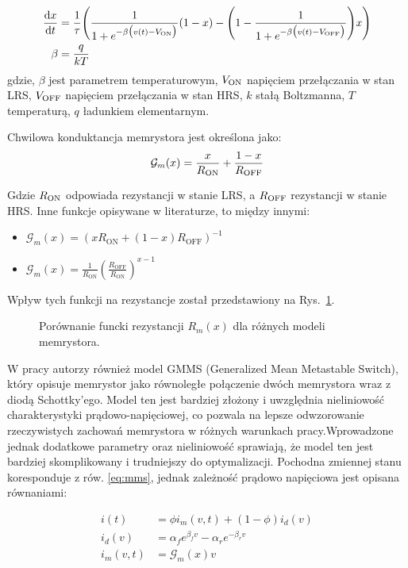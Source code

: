 \documentclass[11pt, oneside]{article}
\newcommand{\G}{\mathcal{G}}
\newcommand{\Ron}{R_{\rm ON}}
\newcommand{\Roff}{R_{\rm OFF}}
\newcommand{\von}{V_{\rm ON}}
\newcommand{\voff}{V_{\rm OFF}}
\newcommand{\ua}{v}
\newcommand{\xw}{x}
\newcommand{\dert}[1]{\frac{{\rm d} {#1}}{{\rm d} t} }
\begin{document}
\begin{align}
    \label{eq:mms}
    \dert{x} & =  \frac{1}{\tau} \Bigg( \frac{1}{1+e^{-\beta \big(\ua(t)-\von\big)}} (1-x)  -\Bigg(1- \frac{1}{1+e^{-\beta \big(\ua(t)-\voff\big)}} \Bigg) x \Bigg) \\
    \label{eq:beta}
    \beta    & = \frac{q}{kT}
\end{align}
gdzie, $\beta$ jest parametrem temperaturowym, $\von$ napięciem przełączania w stan LRS, $\voff$ napięciem przełączania w stan HRS, $k$ stałą Boltzmanna, $T$ temperaturą,  $q$ ładunkiem elementarnym.

Chwilowa konduktancja memrystora jest określona jako:
\begin{equation}
    \G_{m}(\xw) = \frac{\xw}{R_{\rm ON}}+\frac{1-\xw}{R_{\rm OFF}}
\end{equation}

Gdzie $\Ron$ odpowiada rezystancji w stanie LRS, a $\Roff$ rezystancji w stanie HRS.
Inne funkcje opisywane w literaturze, to między innymi:
\begin{itemize}
    \item $\G_m(x) = (x R_{\mathrm{ON}} + (1-x) R_{\mathrm{OFF}})^{-1}$
    \item $\G_m(x) = \frac{1}{R_{\mathrm{ON}}} \left( \frac{R_{\mathrm{OFF}}}{R_{\mathrm{ON}}} \right)^{x-1}$
\end{itemize}
Wpływ tych funkcji na rezystancje został przedstawiony na Rys.~\ref{fig:m-x}.
\begin{figure}[H]
    \centering
    \resizebox{0.5\linewidth}{!}{%
        
    }
    \caption{Porównanie funcki rezystancji $R_m(x)$ dla różnych modeli memrystora.}
    \label{fig:m-x}
\end{figure}


W pracy \cite{Molter2016} autorzy również model GMMS (Generalized Mean Metastable Switch), który opisuje memrystor jako równoległe połączenie dwóch memrystora wraz z diodą Schottky'ego. Model ten jest bardziej złożony i uwzględnia nieliniowość charakterystyki prądowo-napięciowej, co pozwala na lepsze odwzorowanie rzeczywistych zachowań memrystora w różnych warunkach pracy.Wprowadzone jednak dodatkowe parametry oraz nieliniowość sprawiają, że model ten jest bardziej skomplikowany i trudniejszy do optymalizacji. Pochodna zmiennej stanu koresponduje z rów. \eqref{eq:mms}, jednak zależność prądowo napięciowa jest opisana równaniami:

\begin{align}
    i(t)      & = \phi i_m(v, t) + (1-\phi) i_d(v)                 \\
    i_d(v)    & = \alpha_f e^{\beta_f v} - \alpha_r e^{-\beta_r v} \\
    i_m(v, t) & = \G_m(x) v
\end{align}
\end{document}
